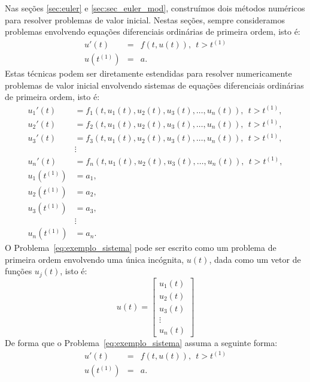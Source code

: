Nas seções \ref{sec:euler} e \ref{sec:sec_euler_mod}, construímos dois métodos numéricos para resolver problemas de valor inicial. Nestas seções, sempre consideramos problemas envolvendo equações diferenciais ordinárias de primeira ordem, isto é:
\begin{eqnarray}
  u'(t)  &=& f(t,u(t)),~~t>t^{(1)} \\
  u(t^{(1)}) &=& a.
\end{eqnarray}
Estas técnicas podem ser diretamente estendidas para resolver numericamente problemas de valor inicial envolvendo sistemas de equações diferenciais ordinárias de primeira ordem, isto é:
\begin{equation}\label{eq:exemplo_sistema}
  \begin{split}
    u_1'(t)  &= f_1(t,u_1(t), u_2(t), u_3(t),\ldots, u_n(t)),~~t>t^{(1)} ,\\
    u_2'(t)  &= f_2(t,u_1(t), u_2(t), u_3(t),\ldots, u_n(t)),~~t>t^{(1)} ,\\
    u_3'(t)  &= f_3(t,u_1(t), u_2(t), u_3(t),\ldots, u_n(t)),~~t>t^{(1)} ,\\
    &\vdots \\
    u_n'(t)  &= f_n(t,u_1(t), u_2(t), u_3(t),\ldots, u_n(t)),~~t>t^{(1)} ,\\
    u_1(t^{(1)}) &= a_1 ,\\
    u_2(t^{(1)}) &= a_2 ,\\
    u_3(t^{(1)}) &= a_3 ,\\
    &\vdots\\
    u_n(t^{(1)}) &= a_n.
  \end{split}
\end{equation}
O Problema~\eqref{eq:exemplo_sistema} pode ser escrito como um problema de primeira ordem envolvendo uma única incógnita, $u(t)$, dada como um vetor de funções $u_j(t)$, isto é:
\begin{equation}u(t)=\left[
\begin{array}{c}
 u_1(t)\\
 u_2(t)\\
 u_3(t)\\
 \vdots\\
 u_n(t)
\end{array}
\right]\end{equation}
De forma que o Problema~\eqref{eq:exemplo_sistema} assuma a seguinte forma:
\begin{eqnarray}
  u'(t)  &=& f(t,u(t)),~~t>t^{(1)} \\
  u(t^{(1)}) &=& a.
\end{eqnarray}

